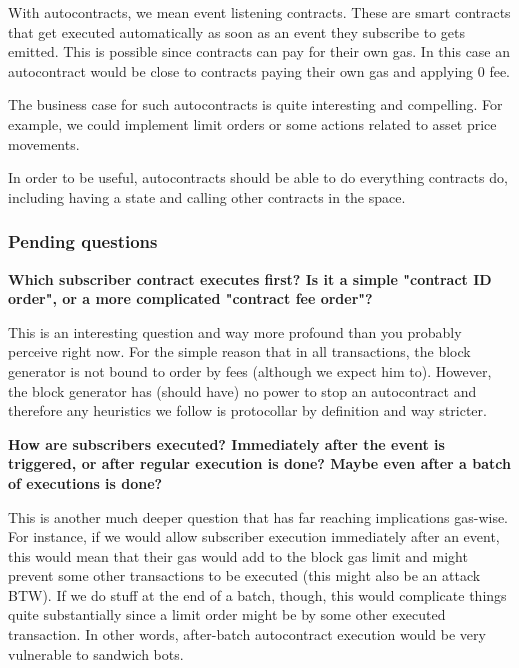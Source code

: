 \documentclass[twocolumn, nofootinbib]{revtex4-2}
\begin{document}
    With autocontracts, we mean event listening contracts.
    These are smart contracts that get executed automatically as soon as an
    event they subscribe to gets emitted.
    This is possible since contracts can pay for their own gas.
    In this case an autocontract would be close to contracts paying their own
    gas and applying 0 fee.

    The business case for such autocontracts is quite interesting and
    compelling.
    For example, we could implement limit orders or some actions related to
    asset price movements.

    In order to be useful, autocontracts should be able to do everything
     contracts do, including having a state and calling other
    contracts in the  space.

    \subsubsection{Pending questions}\label{subsubsec:pending-questions}
    \textbf{Which subscriber contract executes first? Is it a simple "contract
            ID order", or a more complicated "contract fee order"?}

    This is an interesting question and way more profound than you probably
    perceive right now.
    For the simple reason that in all  transactions, the block
    generator is not bound to order by fees (although we expect him to).
    However, the block generator has (should have) no power to stop an
    autocontract and therefore any heuristics we follow is protocollar by
    definition and way stricter.

    \textbf{How are subscribers executed? Immediately after the event is
    triggered, or after regular execution is done? Maybe even after a batch of
    executions is done?}

    This is another much deeper question that has far reaching implications
    gas-wise.
    For instance, if we would allow subscriber execution immediately after an
    event, this would mean that their gas would add to the block gas limit and
    might prevent some other transactions to be executed (this might also be an
    attack BTW). If we do stuff at the end of a batch, though, this would
    complicate things quite substantially since a limit order might be
     by some other executed transaction.
    In other words, after-batch autocontract execution would be very vulnerable
    to sandwich bots.
\end{document}
